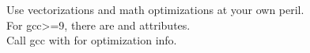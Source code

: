 Use vectorizations and math optimizations at your own peril.\\
For gcc>=9, there are \icode{[[likely]]} and \icode{[[unlikely]]} attributes.\\
Call gcc with  for optimization info.
